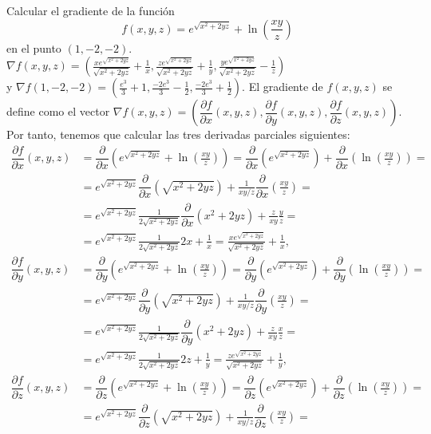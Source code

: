 {Calcular el gradiente de la función 
\[
f(x,y,z)=e^{\sqrt{x^2+2yz}}+\ln (\frac{xy}z)
\]
en el punto $(1,-2,-2)$. 
}
{$\nabla f(x,y,z)=\left(\frac{xe^{\sqrt{x^2+2yz}}}{\sqrt{x^2+2yz}}+\frac{1}{x}, \frac{ze^{\sqrt{x^2+2yz}}}{\sqrt{x^2+2yz}}+\frac{1}{y}, \frac{ye^{\sqrt{x^2+2yz}}}{\sqrt{x^2+2yz}}-\frac{1}{z}\right)$\\ y $\nabla f(1,-2,-2)=\left(\frac{e^3}{3}+1,\frac{-2e^3}{3}-\frac{1}{2},\frac{-2e^3}{3}+\frac{1}{2}\right)$.}
{El gradiente de $f(x,y,z)$ se define como el vector $\nabla f(x,y,z)=\left(\dfrac{\partial f}{\partial x}(x,y,z),\dfrac{\partial f}{\partial y}(x,y,z),\dfrac{\partial f}{\partial z}(x,y,z)\right).$ Por tanto, tenemos que calcular las tres derivadas parciales siguientes:
\begin{align*}
\dfrac{\partial f}{\partial x}(x,y,z) &= \dfrac{\partial}{\partial x}(e^{\sqrt{x^2+2yz}}+\ln (\frac{xy}z)) = \dfrac{\partial}{\partial x}(e^{\sqrt{x^2+2yz}})+\dfrac{\partial}{\partial x}(\ln (\frac{xy}z))= \\
&= e^{\sqrt{x^2+2yz}}\dfrac \partial {\partial x}(\sqrt{x^2+2yz})+\frac{1}{xy/z}\dfrac{\partial}{\partial x}(\frac{xy}z)= \\
&= e^{\sqrt{x^2+2yz}}\frac{1}{2\sqrt{x^2+2yz}}\dfrac{\partial}{\partial x}(x^2+2yz)+\frac{z}{xy}\frac{y}{z}= \\
&= e^{\sqrt{x^2+2yz}}\frac{1}{2\sqrt{x^2+2yz}}2x+\frac{1}{x} = \frac{xe^{\sqrt{x^2+2yz}}}{\sqrt{x^2+2yz}}+\frac{1}{x}, \\
\dfrac{\partial f}{\partial y}(x,y,z) &= \dfrac{\partial}{\partial y}(e^{\sqrt{x^2+2yz}}+\ln (\frac{xy}z)) = \dfrac{\partial}{\partial y}(e^{\sqrt{x^2+2yz}})+\dfrac{\partial}{\partial y}(\ln (\frac{xy}z))= \\
&= e^{\sqrt{x^2+2yz}}\dfrac{\partial}{\partial y}(\sqrt{x^2+2yz})+\frac{1}{xy/z}\dfrac{\partial}{\partial y}(\frac{xy}z)= \\
&= e^{\sqrt{x^2+2yz}}\frac{1}{2\sqrt{x^2+2yz}}\dfrac{\partial}{\partial y}(x^2+2yz)+\frac{z}{xy}\frac{x}{z}= \\
&= e^{\sqrt{x^2+2yz}}\frac{1}{2\sqrt{x^2+2yz}}2z+\frac{1}{y}=\frac{ze^{\sqrt{x^2+2yz}}}{\sqrt{x^2+2yz}}+\frac{1}{y}, \\
\dfrac{\partial f}{\partial z}(x,y,z) &= \dfrac{\partial}{\partial z}(e^{\sqrt{x^2+2yz}}+\ln (\frac{xy}z)) = \dfrac{\partial}{\partial z}(e^{\sqrt{x^2+2yz}})+\dfrac{\partial}{\partial z}(\ln (\frac{xy}{z}))= \\
&= e^{\sqrt{x^2+2yz}}\dfrac{\partial}{\partial z}(\sqrt{x^2+2yz})+\frac{1}{xy/z}\dfrac{\partial}{\partial z}(\frac{xy}{z})= \\

\end{align*}}
